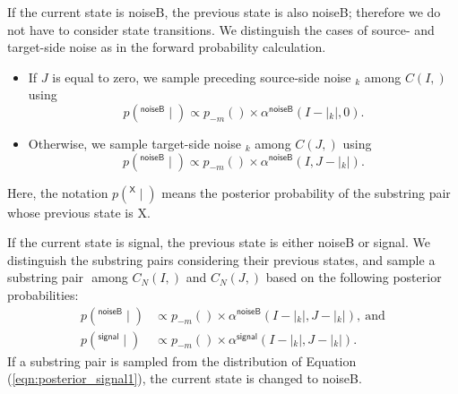 \documentclass[english]{jnlp_1.4}
\def\pair#1#2{}
\def\subpair#1#2{}
\newcommand{\svec}[1]{}
\begin{document}
If the current state is {\sf noiseB}, 
the previous state is also {\sf noiseB}; therefore we do not have to consider state transitions.
We distinguish the cases of source- and target-side noise as in the forward probability calculation.
\begin{itemize}
\item If {$J$} is equal to zero, we sample preceding source-side noise {$\svec{\sigma}_{k}$} among {$C(I,\svec{s})$} using
\begin{equation}
 p (\subpair{\svec{\sigma}_{k}}{\mathit{noise}}^\mathsf{noiseB} \mid \pair{\boldsymbol{s}}{\boldsymbol{t}}) \propto
	 p_{-m} (\subpair{\svec{\sigma}_{k}}{\mathit{noise}}) \times \alpha^\mathsf{noiseB} (I - |\svec{\sigma}_{k}|, 0).
\label{eqn:posterior_noiseB1}
\end{equation}
\item Otherwise, we sample target-side noise {$\svec{\tau}_{k}$} among {$C(J,\svec{t})$} using
\begin{equation}
 p (\subpair{\mathit{noise}}{\svec{\tau}_{k}}^\mathsf{noiseB} \mid \pair{\boldsymbol{s}}{\boldsymbol{t}}) \propto 
	 p_{-m} (\subpair{\mathit{noise}}{\svec{\tau}_{k}}) \times \alpha^\mathsf{noiseB} ( I, J - |\svec{\tau}_{k}|).
\label{eqn:posterior_noiseB2}
\end{equation}
\end{itemize}
Here, the notation {$p (\subpair{\svec{\sigma}_{k}}{\svec{\tau}_{k}}^\mathsf{X} \mid \pair{\boldsymbol{s}}{\boldsymbol{t}})$} means the posterior probability of the substring pair {$\subpair{\svec{\sigma}_{k}}{\svec{\tau}_{k}}$} whose previous state is {\sf X}.

If the current state is {\sf signal}, the previous state is either {\sf noiseB} or {\sf signal}.
We distinguish the substring pairs considering their previous states, and sample a substring pair {$\subpair{\svec{\sigma}_{k}}{\svec{\tau}_{k}}$}
among {$C_{N} (I,\svec{s})$} and {$C_{N} (J,\svec{t})$} based on the following posterior probabilities:
\begin{align}
 p (\subpair{\svec{\sigma}_{k}}{\svec{\tau}_{k}}^\mathsf{noiseB} \mid \pair{\boldsymbol{s}}{\boldsymbol{t}}) 
	& \propto p_{-m} (\subpair{\svec{\sigma}_{k}}{\svec{\tau}_{k}}) 
	\times \alpha^\mathsf{noiseB} (I - |\svec{\sigma}_{k}|, J - |\svec{\tau}_{k}|),\ \text{and}
	\label{eqn:posterior_signal1}\\
 p (\subpair{\svec{\sigma}_{k}}{\svec{\tau}_{k}}^\mathsf{signal} \mid \pair{\boldsymbol{s}}{\boldsymbol{t}}) 
	& \propto p_{-m} (\subpair{\svec{\sigma}_{k}}{\svec{\tau}_{k}}) 
	\times \alpha^\mathsf{signal} (I - |\svec{\sigma}_{k}|, J - |\svec{\tau}_{k}|).
	\label{eqn:posterior_signal2}
\end{align}
If a substring pair is sampled from the distribution of Equation ({\ref{eqn:posterior_signal1}}), the current state is changed to {\sf noiseB}.
\end{document}
